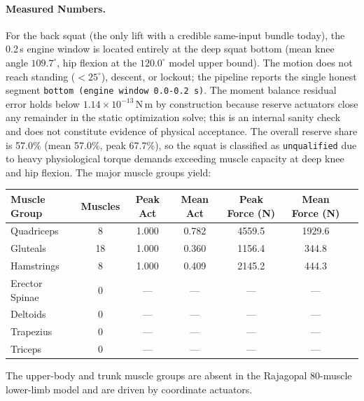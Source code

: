 \documentclass[11pt,a4paper]{article}
\begin{document}
\paragraph{Measured Numbers.}
For the back squat (the only lift with a credible same-input bundle today),
the 0.2\,s engine window is located entirely at the deep squat bottom (mean knee
angle $109.7^\circ$, hip flexion at the $120.0^\circ$ model upper bound). The motion
does not reach standing ($< 25^\circ$), descent, or lockout; the pipeline reports the
single honest segment \texttt{bottom (engine window 0.0-0.2 s)}. The moment balance
residual error holds below $1.14 \times 10^{-13}\,\mathrm{N\,m}$ by construction because
reserve actuators close any remainder in the static optimization solve; this is an
internal sanity check and does not constitute evidence of physical acceptance.
The overall reserve share is 57.0\% (mean 57.0\%, peak 67.7\%), so the squat is classified
as \texttt{unqualified} due to heavy physiological torque demands exceeding muscle capacity
at deep knee and hip flexion. The major muscle groups yield:
\begin{center}\footnotesize\setlength{\tabcolsep}{4pt}
\begin{tabular}{lcccccc}
\toprule
Muscle Group & Muscles & Peak Act & Mean Act & Peak Force (N) & Mean Force (N)\\
\midrule
Quadriceps & 8 & 1.000 & 0.782 & 4559.5 & 1929.6\\
Gluteals & 18 & 1.000 & 0.360 & 1156.4 & 344.8\\
Hamstrings & 8 & 1.000 & 0.409 & 2145.2 & 444.3\\
Erector Spinae & 0 & --- & --- & --- & ---\\
Deltoids & 0 & --- & --- & --- & ---\\
Trapezius & 0 & --- & --- & --- & ---\\
Triceps & 0 & --- & --- & --- & ---\\
\bottomrule
\end{tabular}
\end{center}
The upper-body and trunk muscle groups are absent in the Rajagopal 80-muscle lower-limb model
and are driven by coordinate actuators.
\end{document}
